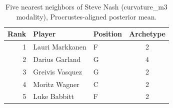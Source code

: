 \begin{table}[htbp]
  \centering\small
  \begin{tabular}{rllc}
    \toprule
    Rank & Player & Position & Archetype \\
    \midrule
    1 & Lauri Markkanen & F & 2 \\
    2 & Darius Garland & G & 4 \\
    3 & Greivis Vasquez & G & 2 \\
    4 & Moritz Wagner & C & 2 \\
    5 & Luke Babbitt & F & 2 \\
    \bottomrule
  \end{tabular}
  \caption{Five nearest neighbors of Steve Nash (curvature_m3 modality), Procrustes-aligned posterior mean.}
  \label{tab:Steve_Nash_neighbors_curvature_m3}
\end{table}

